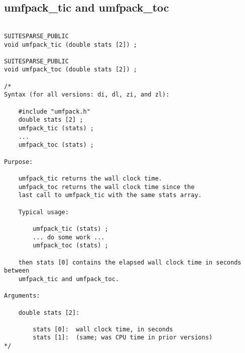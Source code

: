 \documentclass[11pt]{article}
\begin{document}
\newpage
\subsection{umfpack\_tic and umfpack\_toc}

{\footnotesize
\begin{verbatim}

SUITESPARSE_PUBLIC
void umfpack_tic (double stats [2]) ;

SUITESPARSE_PUBLIC
void umfpack_toc (double stats [2]) ;

/*
Syntax (for all versions: di, dl, zi, and zl):

    #include "umfpack.h"
    double stats [2] ;
    umfpack_tic (stats) ;
    ...
    umfpack_toc (stats) ;

Purpose:

    umfpack_tic returns the wall clock time.
    umfpack_toc returns the wall clock time since the
    last call to umfpack_tic with the same stats array.

    Typical usage:

        umfpack_tic (stats) ;
        ... do some work ...
        umfpack_toc (stats) ;

    then stats [0] contains the elapsed wall clock time in seconds between
    umfpack_tic and umfpack_toc.

Arguments:

    double stats [2]:

        stats [0]:  wall clock time, in seconds
        stats [1]:  (same; was CPU time in prior versions)
*/

\end{verbatim}
}


\newpage



\end{document}
